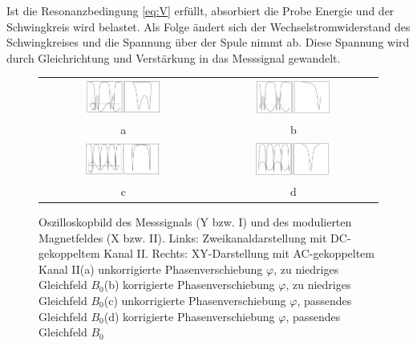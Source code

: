 \documentclass[ngerman]{scrartcl}
\begin{document}
Ist die Resonanzbedingung \ref{eq:V} erfüllt, absorbiert die Probe Energie und der Schwingkreis wird belastet. Als Folge ändert sich der Wechselstromwiderstand des Schwingkreises und die Spannung über der Spule nimmt ab. Diese Spannung wird durch Gleichrichtung und Verstärkung in das Messsignal gewandelt.
%
\begin{figure}[H]
    \centering
    \begin{tabular}{cc}
        \includegraphics[width=0.48\textwidth]{fig/grund_a.png} &
        \includegraphics[width=0.48\textwidth]{fig/grund_b.png}     \\
        a                                                       & b \\
        \includegraphics[width=0.48\textwidth]{fig/grund_c.png} &
        \includegraphics[width=0.48\textwidth]{fig/grund_d.png}     \\
        c                                                       & d \\
    \end{tabular}
    \caption[Oszilloskopbild des Messsignals]{Oszilloskopbild des Messsignals (Y bzw. I) und des modulierten Magnetfeldes (X bzw. II). Links: Zweikanaldarstellung mit DC-gekoppeltem Kanal II. Rechts: XY-Darstellung mit AC-gekoppeltem Kanal II\newline (a) unkorrigierte Phasenverschiebung $\varphi$, zu niedriges Gleichfeld $B_0$\newline (b) korrigierte Phasenverschiebung $\varphi$, zu niedriges Gleichfeld $B_0$\newline (c) unkorrigierte Phasenverschiebung $\varphi$, passendes Gleichfeld $B_0$\newline (d) korrigierte Phasenverschiebung $\varphi$, passendes Gleichfeld $B_0$}
    \label{fig:grundlagen_oszibilder}
\end{figure}
\end{document}
